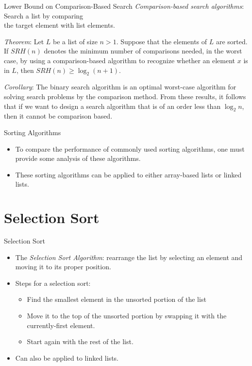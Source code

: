 \documentclass[14pt,aspectratio=1610]{beamer}
\begin{document}
\begin{frame}{Lower Bound on Comparison-Based Search}
\small
\emph{Comparison-based search algorithms}: Search a list by comparing \\the target element with list elements.
\pause{}

\emph{Theorem}: Let $L$ be a list of size $n > 1$. Suppose that the elements of $L$ are sorted. If $SRH(n)$ denotes the minimum number of comparisons needed, in the worst case, by using a comparison-based algorithm to recognize whether an element $x$ is in $L$, then $SRH(n) \ge \log_2(n + 1)$.
\pause{}

\emph{Corollary}: The binary search algorithm is an optimal worst-case algorithm for solving search problems by the comparison method.
From these results, it follows that if we want to design a search algorithm that is of an order less than $\log_2{n}$, then it cannot be comparison based.
\end{frame}

\begin{frame}{Sorting Algorithms}

\begin{itemize}
  \item
    To compare the performance of commonly used sorting algorithms, one must provide some analysis of these algorithms.
  \item
    These sorting algorithms can be applied to either array-based lists or linked lists.
\end{itemize}
\end{frame}

\section{Selection Sort}


\begin{frame}{Selection Sort}

\begin{itemize}
  \item<1->
    The \emph{Selection Sort Algorithm}: rearrange the list by selecting an element and moving it to its proper position.
  \item<2->
    Steps for a selection sort:
    \begin{itemize}
      \item
        Find the smallest element in the unsorted portion of the list
      \item
        Move it to the top of the unsorted portion by swapping it with the currently-first element.
      \item
        Start again with the rest of the list.
    \end{itemize}
  \item<3->
    Can also be applied to linked lists.
\end{itemize}
\end{frame}
\end{document}
